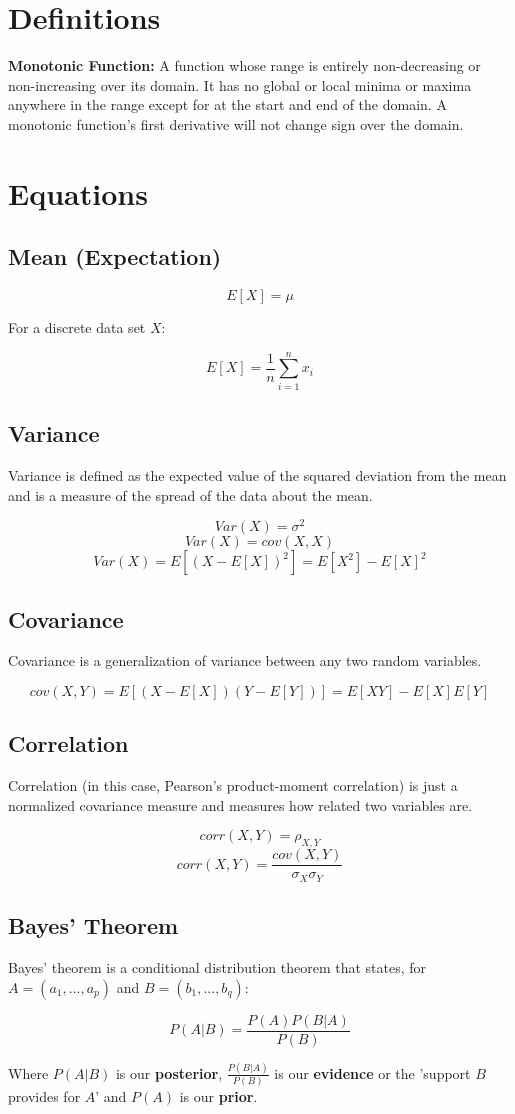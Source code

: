 \section{Definitions}

\textbf{Monotonic Function:} A function whose range is entirely non-decreasing or non-increasing over its domain. It has no global or local minima or maxima anywhere in the range except for at the start and end of the domain. A monotonic function's first derivative will not change sign over the domain.

\section{Equations}

\subsection{Mean (Expectation)}

$$ E[X] = \mu $$

For a discrete data set $X$:

$$ E[X] = \frac{1}{n} \sum_{i=1}^{n} x_{i} $$

\subsection{Variance} 

Variance is defined as the expected value of the squared deviation from the mean and is a measure of the spread of the data about the mean.

$$ Var(X) = \sigma^{2} $$
$$ Var(X) = cov(X,X) $$
$$ Var(X) = E[(X-E[X])^{2}] = E[X^{2}] - E[X]^2 $$

\subsection{Covariance}

Covariance is a generalization of variance between any two random variables.

$$ cov(X,Y) = E[(X-E[X])(Y-E[Y])] = E[XY] - E[X]E[Y] $$

\subsection{Correlation}

Correlation (in this case, Pearson's product-moment correlation) is just a normalized covariance measure and measures how related two variables are.

$$ corr(X,Y) = \rho_{X,Y} $$
$$ corr(X,Y) = \frac{cov(X,Y)}{\sigma_{X}\sigma_{Y}} $$

\subsection{Bayes' Theorem}

Bayes' theorem is a conditional distribution theorem that states, for $A=(a_{1},...,a_{p})$ and $B=(b_{1},...,b_{q})$:

$$ P(A|B) = \frac{P(A)P(B|A)}{P(B)} $$

Where $P(A|B)$ is our \textbf{posterior}, $\frac{P(B|A)}{P(B)}$ is our \textbf{evidence} or the 'support $B$ provides for $A$' and $P(A)$ is our \textbf{prior}.

